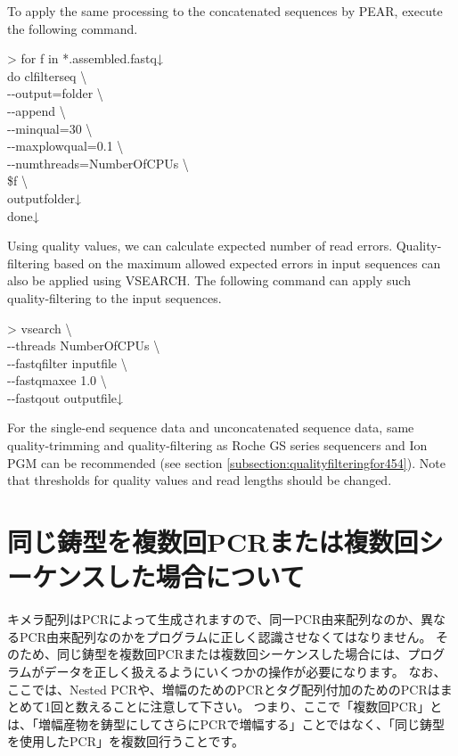 \documentclass[titlepage,10pt,a4paper,english]{jsbook}
\newenvironment{cmd}{\begin{oframed}\raggedright\ttfamily\footnotesize\setlength{\baselineskip}{1.4em}}{\end{oframed}\vspace{-1em}}
\begin{document}
To apply the same processing to the concatenated sequences by PEAR, execute the following command.

\begin{cmd}
{\textgreater} for f in *.assembled.fastq↓\\
do clfilterseq {\textbackslash}\\
{-}{-}output=folder {\textbackslash}\\
{-}{-}append {\textbackslash}\\
{-}{-}minqual=30 {\textbackslash}\\
{-}{-}maxplowqual=0.1 {\textbackslash}\\
{-}{-}numthreads=NumberOfCPUs {\textbackslash}\\
\$f {\textbackslash}\\
outputfolder↓\\
done↓
\end{cmd}

Using quality values, we can calculate expected number of read errors.
Quality-filtering based on the maximum allowed expected errors in input sequences can also be applied using VSEARCH.
The following command can apply such quality-filtering to the input sequences.

\begin{cmd}
{\textgreater} vsearch {\textbackslash}\\
{-}{-}threads NumberOfCPUs {\textbackslash}\\
{-}{-}fastq{\textunderscore}filter inputfile {\textbackslash}\\
{-}{-}fastq{\textunderscore}maxee 1.0 {\textbackslash}\\
{-}{-}fastqout outputfile↓
\end{cmd}

For the single-end sequence data and unconcatenated sequence data, same quality-trimming and quality-filtering as Roche GS series sequencers and Ion PGM can be recommended (see section \ref{subsection:qualityfilteringfor454}).
Note that thresholds for quality values and read lengths should be changed.

\section{同じ鋳型を複数回PCRまたは複数回シーケンスした場合について}

キメラ配列はPCRによって生成されますので、同一PCR由来配列なのか、異なるPCR由来配列なのかをプログラムに正しく認識させなくてはなりません。
そのため、同じ鋳型を複数回PCRまたは複数回シーケンスした場合には、プログラムがデータを正しく扱えるようにいくつかの操作が必要になります。
なお、ここでは、Nested PCRや、増幅のためのPCRとタグ配列付加のためのPCRはまとめて1回と数えることに注意して下さい。
つまり、ここで「複数回PCR」とは、「増幅産物を鋳型にしてさらにPCRで増幅する」ことではなく、「同じ鋳型を使用したPCR」を複数回行うことです。
\end{document}
